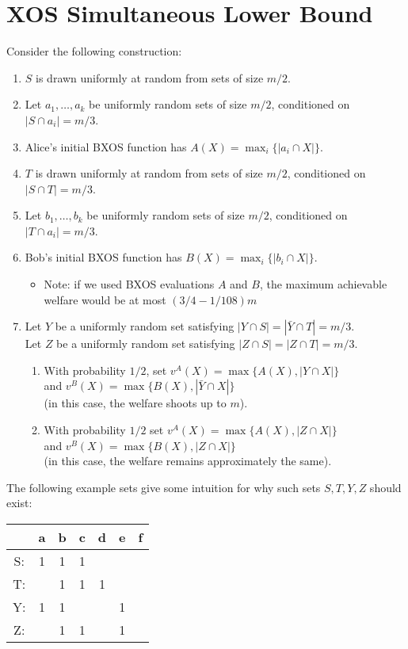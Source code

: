 \section{XOS Simultaneous Lower Bound} 
  Consider the following construction:

  \begin{enumerate} 
    \item $S$ is drawn uniformly at random from sets of size $m/2$.
    \item Let $a_1,\ldots, a_k$ be uniformly random sets of size $m/2$,
      conditioned on $|S \cap a_i| = m/3$.
    \item Alice's initial BXOS function has $A(X) = \max_i \{|a_i \cap X|\}$.
    \item $T$ is drawn uniformly at random from sets of size $m/2$,
      conditioned on $|S \cap T| = m/3$.
    \item Let $b_1,\ldots, b_k$ be uniformly random sets of size $m/2$,
      conditioned on $|T \cap a_i| = m/3$.
    \item Bob's initial BXOS function has $B(X) = \max_i \{|b_i \cap X|\}$.
      \begin{itemize}
        \item Note: if we used BXOS evaluations $A$ and $B$,
          the maximum achievable welfare would be at most $(3/4 - 1/108)m$
      \end{itemize}
    \item Let $Y$ be a uniformly random set
      satisfying $|Y \cap S| = |\bar{Y} \cap T| = m/3$. \\ 
      Let $Z$ be a uniformly
      random set satisfying $|Z \cap S| = |Z \cap T| = m/3$.
      \begin{enumerate}
        \item With probability
          $1/2$, set $v^A(X) = \max\{A(X),|Y \cap X|\}$ \\ 
          and $v^B(X) = \max\{B(X), |\bar{Y} \cap X|\}$ \\
          (in this case, the welfare shoots up to $m$).
        \item With probability $1/2$ set $v^A(X) = \max\{A(X), |Z \cap X|\}$ \\ 
          and $v^B(X) = \max\{B(X), |Z\cap X|\}$ \\
          (in this case, the welfare remains approximately the same).
      \end{enumerate}
  \end{enumerate}

  The following example sets give some intuition for why such sets $S,T,Y,Z$
  should exist:
  \begin{center}
    \begin{tabular}{ c | c c c c c c }
         & a & b & c & d & e & f \\
      \hline
      S: & 1 & 1 & 1 &   &   \\
      T: &   & 1 & 1 & 1 &   \\
      Y: & 1 & 1 &   &   & 1 \\
      Z: &   & 1 & 1 &   & 1
    \end{tabular}
  \end{center}



